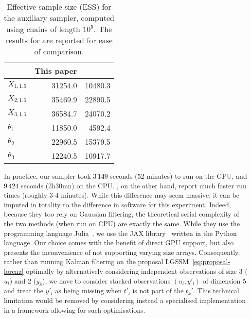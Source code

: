 \begin{table}
    \centering
    \begin{tabular}{ lrr }
        \toprule
        & This paper & \citet{mider2021continuous} \\
        \midrule
        $X_{1,1.5}$ & 31254.0    & 10480.3                     \\
        $X_{2,1.5}$ & 35469.9    & 22890.5                     \\
        $X_{3,1.5}$ & 36584.7    & 24070.2                     \\
        \midrule
        $\theta_1$  & 11850.0    & 4592.4                      \\
        $\theta_2$  & 22960.5    & 15379.5                     \\
        $\theta_3$  & 12240.5    & 10917.7                     \\
        \bottomrule
    \end{tabular}
    \caption{Effective sample size (ESS) for the auxiliary sampler, computed using chains of length $10^5$. The results for \citet{mider2021continuous} are reported for ease of comparison.}
    \label{tab:ess_lorenz}
\end{table}

In practice, our sampler took $3\,149$ seconds (52 minutes) to run on the GPU, and $9\,424$ seconds (2h30mn) on the CPU. \citet{mider2021continuous}, on the other hand, report much faster run times (roughly 3-4 minutes). While this difference may seem massive, it can be imputed in totality to the difference in software for this experiment. Indeed, because they too rely on Gaussian filtering, the theoretical serial complexity of the two methods (when run on CPU) are exactly the same. While they use the programming language Julia~\citep{Julia-2017}, we use the JAX library~\citep{jax2018github} written in the Python language. Our choice comes with the benefit of direct GPU support, but also presents the inconvenience of not supporting varying size arrays. Consequently, rather than running Kalman filtering on the proposal LGSSM~\eqref{eq:proposal-lorenz} optimally by alternatively considering independent observations of size $3$ ($u_l$) and $2$ ($y_k$), we have to consider stacked observations $(u_l, y'_l)$ of dimension 5 and treat the $y'_l$ as being missing when $t'_l$ is not part of the $t_k'$. This technical limitation would be removed by considering instead a specialised implementation in a framework allowing for such optimisations.